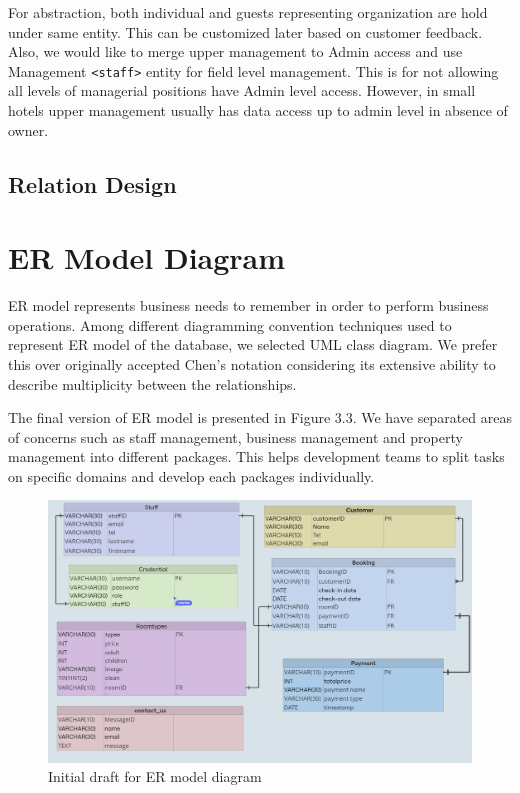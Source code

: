 For abstraction, both individual and guests representing organization are hold under same entity. This can be customized later based on customer feedback. Also, we would like to merge upper management to Admin access and use Management \texttt{<staff>} entity for field level management. This is for not allowing all levels of managerial positions have Admin level access. However, in small hotels upper management usually has data access up to admin level in absence of owner.

\subsection{Relation Design}

\section[ER Model]{ER Model Diagram}

ER model represents business needs to remember in order to perform business operations. \cite{Bagui2022} Among different diagramming convention techniques used to represent ER model of the database, we selected UML class diagram. We prefer this over originally accepted Chen's notation considering its extensive ability to describe multiplicity between the relationships. \cite{broy_entity-relationship_2002}

The final version of ER model is presented in Figure 3.3. We have separated areas of concerns such as staff management, business management and property management into different packages. This helps development teams to split tasks on specific domains and develop each packages individually.

\begin{figure}[h]
	\centerline
	{\includegraphics[width=15cm]{fig/ERD_v1}}
	\caption{Initial draft for ER model diagram}
\end{figure} 

